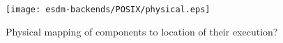 \begin{figure}
	\centering
	\texttt{[image: esdm-backends/POSIX/physical.eps]}
	\caption{Physical mapping of components to location of their execution?}
	\label{fig:backend posix physical view}
\end{figure}



%
%
%
%
%
%
%
%
%
